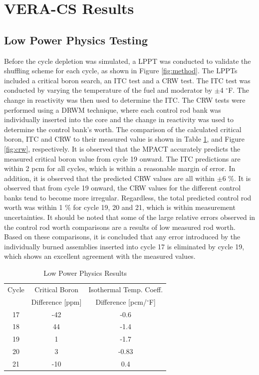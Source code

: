 \documentclass[edeposit,fullpage,11pt]{uiucthesis2009}
\begin{document}
\section{VERA-CS Results}

\subsection{Low Power Physics Testing}
Before the cycle depletion was simulated, a \gls{LPPT} was conducted to validate the shuffling scheme for each cycle, as shown in Figure \ref{fig:method}.
The \gls{LPPT}s included a critical boron search, an \gls{ITC} test and a \gls{CRW} test. 
The \gls{ITC} test was conducted by varying the temperature of the fuel and moderator by $\pm$4 $^\circ$F. 
The change in reactivity was then used to determine the \gls{ITC}. 
The \gls{CRW} tests were performed using a \gls{DRWM} technique, where each control rod bank was individually inserted into the core and the change in reactivity was used to determine the control bank's worth. 
The comparison of the calculated critical boron, \gls{ITC} and \gls{CRW} to their measured value is shown in Table \ref{tab:cb}, and Figure \ref{fig:crw}, respectively. 
It is observed that the MPACT accurately predicts the measured critical boron value from cycle 19 onward.
The \gls{ITC} predictions are within 2 pcm for all cycles, which is within a reasonable margin of error.
In addition, it is observed that the predicted \gls{CRW} values are all within $\pm6$ \%.
It is observed that from cycle 19 onward, the \gls{CRW} values for the different control banks tend to become more irregular.
Regardless, the total predicted control rod worth was within 1 \% for cycle 19, 20 and 21, which is within measurement uncertainties. 
It should be noted that some of the large relative errors observed in the control rod worth comparisons are a results of low measured rod worth. 
Based on these comparisons, it is concluded that any error introduced by the individually burned assemblies inserted into cycle 17 is eliminated by cycle 19, which shows an excellent agreement with the measured values. 

\begin{table}
\caption{Low Power Physics Results}
\label{tab:cb}
\begin{center}
\begin{tabular}[!t]{|c|c|c|}
\hline
Cycle      & Critical Boron   & Isothermal Temp. Coeff.      \\
           & Difference [ppm] & Difference [pcm/$^{\circ}$F]  \\ \hline
17 & -42 & -0.6     \\\hline
18 & 44  & -1.4     \\\hline
19 & 1   & -1.7     \\\hline
20 & 3 & -0.83     \\\hline
21 & -10 & 0.4     \\\hline
\end{tabular}
\end{center}
\end{table}
\end{document}

